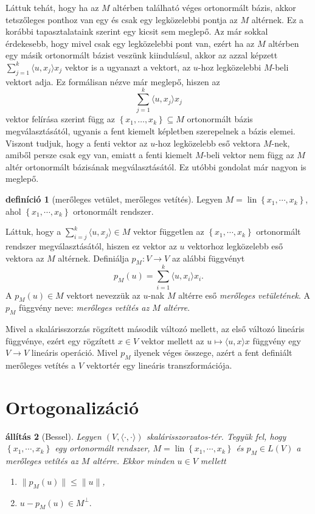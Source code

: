 \documentclass[9pt, a4paper, showtrims]{memoir}
\theoremstyle{plain}
\newtheorem{proposition}{állítás}[chapter]
\theoremstyle{remark}
\theoremstyle{definition}
\newtheorem{definition}[proposition]{definíció}
\DeclareMathOperator{\lin}{lin}
\newcommand{\ip}[2]{\langle#1,#2\rangle}
\begin{document}
Láttuk tehát, hogy ha az $M$ altérben található véges ortonormált bázis,
akkor tetszőleges ponthoz van egy és csak egy legközelebbi pontja az $M$ altérnek.
Ez a korábbi tapasztalataink szerint egy kicsit sem meglepő.
Az már sokkal érdekesebb, hogy mivel csak egy legközelebbi pont van, ezért
ha az $M$ altérben egy másik ortonormált bázist veszünk kiindulásul, akkor az azzal képzett
$\sum_{j=1}^k\ip{u}{x_j}x_j$ vektor is a ugyanazt a vektort, az $u$-hoz legközelebbi $M$-beli vektort adja.
Ez formálisan nézve már meglepő, hiszen az 
\[
    \sum_{j=1}^k\ip{u}{x_j}x_j
\]
vektor felírása szerint függ az $\left\{ x_1,\dots,x_k \right\}\subseteq M$ ortonormált bázis megválasztásától,
ugyanis a fent kiemelt képletben szerepelnek a bázis elemei. 
Viszont tudjuk, hogy a fenti vektor az $u$-hoz legközelebb eső vektora $M$-nek, amiből persze csak egy van,
emiatt a fenti kiemelt $M$-beli vektor nem függ az $M$ altér ortonormált bázisának megválasztásától.
Ez utóbbi gondolat már nagyon is meglepő.
\begin{definition}[merőleges vetület, merőleges vetítés]
    Legyen $M=\lin\left\{ x_1,\cdots,x_k \right\}$, 
    ahol $\left\{ x_1,\cdots,x_k \right\}$ ortonormált rendszer.

    Láttuk, hogy a 
    $\sum_{i=j}^k\ip{u}{x_j}\in M$ vektor független
    az $\left\{ x_1,\cdots,x_k \right\}$ ortonormált rendszer megválasztásától, 
    hiszen ez vektor az $u$ vektorhoz legközelebb eső vektora az $M$ altérnek.
    Definiálja $p_M:V\to V$ az alábbi függvényt
    \[
        p_M\left( u \right)=
        \sum_{i=1}^k\ip{u}{x_i}x_i.
    \]
    A $p_M\left( u \right)\in M$ vektort nevezzük az $u$-nak $M$ altérre eső \emph{merőleges vetületének}.
    A $p_M$ függvény neve: \emph{merőleges vetítés az $M$ altérre}.
\end{definition}
Mivel a skalárisszorzás rögzített második változó mellett, 
az első változó lineáris függvénye,
ezért egy rögzített $x\in V$ vektor mellett az $u\mapsto\ip{u}{x}x$ függvény egy $V\to V$ lineáris operáció.
Mivel $p_M$ ilyenek véges összege, azért a fent definiált merőleges vetítés a $V$ vektortér egy lineáris transzformációja.

\section{Ortogonalizáció}

\begin{proposition}[Bessel]
    Legyen $\left( V,\ip{\cdot}{\cdot} \right)$ skalárisszorzatos-tér.
    Tegyük fel, hogy $\left\{ x_1,\cdots,x_k \right\}$ egy ortonormált rendszer,
    $M=\lin\left\{ x_1,\cdots,x_k \right\}$
    és $p_M\in L\left( V \right)$ a merőleges vetítés az $M$ altérre.
    Ekkor minden $u\in V$ mellett
    \begin{enumerate}
        \item
            $\|p_M\left( u \right)\|\leq\|u\|$,
        \item
            \(
            u-p_M(u)\in M^\perp.
            \) 
            \qedhere
    \end{enumerate}
\end{proposition}
\end{document}
